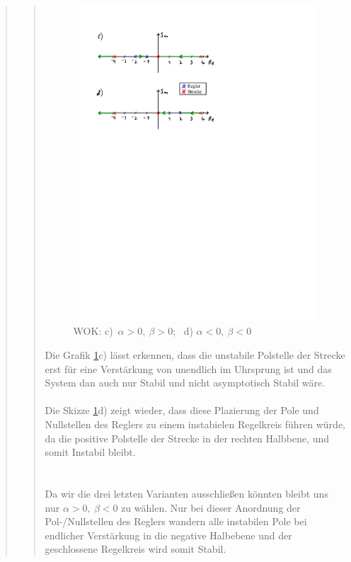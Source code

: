 \begin{quote}
\begin{quote}
        
        \begin{figure}[H]
        \centering
            \includegraphics[scale=1, trim = 2cm 16.7cm 9cm 2cm, clip]{Bilder/WOK_GK_phi_2}
                \caption{WOK: c)\ $\alpha > 0,\ \beta > 0$; \ d) $\alpha < 0,\ \beta < 0$}
                \label{fig:WOK_GK_phi_2}
        \end{figure}
        
        
        Die Grafik \ref{fig:WOK_GK_phi_2}c) lässt erkennen, dass die unstabile Polstelle der Strecke erst für eine Verstärkung von
        unendlich im Uhrsprung ist und das System dan auch nur Stabil und nicht asymptotisch Stabil wäre.\\
        \\
        Die Skizze \ref{fig:WOK_GK_phi_2}d) zeigt wieder, dass diese Plazierung der Pole und Nullstellen des Reglers zu einem
        instabielen Regelkreis führen würde, da die positive Polstelle der Strecke in der rechten Halbbene, und somit Instabil
        bleibt.\\
        \\
        \\
        Da wir die drei letzten Varianten ausschließen könnten bleibt uns nur $\alpha > 0,\ \beta < 0$ zu wählen. Nur bei dieser
        Anordnung der Pol-/Nullstellen des Reglers wandern alle instabilen Pole bei endlicher Verstärkung in die negative
        Halbebene und der geschlossene Regelkreis wird somit Stabil.
        

\end{quote}
\end{quote}

